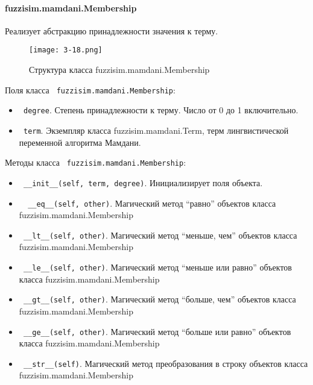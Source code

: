 \paragraph{ fuzzisim.mamdani.Membership}

Реализует абстракцию принадлежности значения к терму.

\begin{figure}[ht]
	\centering
	\texttt{[image: 3-18.png]}
	\caption{ Структура класса  fuzzisim.mamdani.Membership}
\end{figure}

Поля класса \lstinline! fuzzisim.mamdani.Membership!:
\begin{itemize}
	\item \lstinline! degree!. Степень принадлежности к терму. Число от 0 до 1 включительно.
	\item \lstinline! term!.   Экземпляр класса  fuzzisim.mamdani.Term, терм лингвистической переменной алгоритма Мамдани.
\end{itemize}


Методы класса \lstinline! fuzzisim.mamdani.Membership!:
\begin{itemize}
	\item \lstinline! __init__(self, term, degree)!. Инициализирует поля объекта.
	\item \lstinline!  __eq__(self, other)!. Магический метод “равно” объектов класса fuzzisim.mamdani.Membership
	\item \lstinline! __lt__(self, other)!. Магический метод “меньше, чем” объектов класса fuzzisim.mamdani.Membership
	\item \lstinline! __le__(self, other)!. Магический метод “меньше или равно” объектов класса fuzzisim.mamdani.Membership
	\item \lstinline! __gt__(self, other)!. Магический метод “больше, чем” объектов класса fuzzisim.mamdani.Membership
	\item \lstinline! __ge__(self, other)!. Магический метод “больше или равно” объектов класса fuzzisim.mamdani.Membership
	\item \lstinline! __str__(self)!. Магический метод преобразования в строку объектов класса fuzzisim.mamdani.Membership
\end{itemize}







